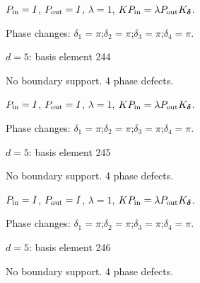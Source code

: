 \vspace{-1mm}
$P_{\rm in}=I$, \quad $P_{\rm out}=I$, \quad $\lambda=1$, \qquad $K P_{\rm in}=\lambda P_{\rm out}K_{\boldsymbol\delta}$.
\par\smallskip\begin{minipage}{.98\linewidth}\small Phase changes: $\delta_{1}=\pi$;\quad $\delta_{2}=\pi$;\quad $\delta_{3}=\pi$;\quad $\delta_{4}=\pi$.\end{minipage}
\vfill
{\footnotesize\texttt{}}
\newpage
{}
{\Large $d=5$: basis element 244}\par
No boundary support. 4 phase defects.
\begin{center}
\end{center}
\vspace{-1mm}
$P_{\rm in}=I$, \quad $P_{\rm out}=I$, \quad $\lambda=1$, \qquad $K P_{\rm in}=\lambda P_{\rm out}K_{\boldsymbol\delta}$.
\par\smallskip\begin{minipage}{.98\linewidth}\small Phase changes: $\delta_{1}=\pi$;\quad $\delta_{2}=\pi$;\quad $\delta_{3}=\pi$;\quad $\delta_{4}=\pi$.\end{minipage}
\vfill
{\footnotesize\texttt{}}
\newpage
{}
{\Large $d=5$: basis element 245}\par
No boundary support. 4 phase defects.
\begin{center}
\end{center}
\vspace{-1mm}
$P_{\rm in}=I$, \quad $P_{\rm out}=I$, \quad $\lambda=1$, \qquad $K P_{\rm in}=\lambda P_{\rm out}K_{\boldsymbol\delta}$.
\par\smallskip\begin{minipage}{.98\linewidth}\small Phase changes: $\delta_{1}=\pi$;\quad $\delta_{2}=\pi$;\quad $\delta_{3}=\pi$;\quad $\delta_{4}=\pi$.\end{minipage}
\vfill
{\footnotesize\texttt{}}
\newpage
{}
{\Large $d=5$: basis element 246}\par
No boundary support. 4 phase defects.
\begin{center}
\end{center}
\vspace{-1mm}
